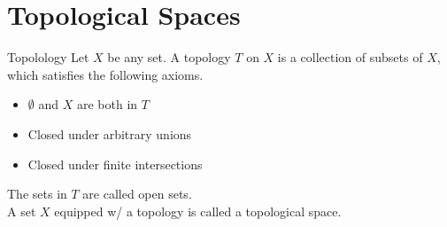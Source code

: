 \section{Topological Spaces}
\begin{definition}{Topolology}{}
    Let $X$ be any set. A topology $T$ on $X$ is a collection of subsets of
    $X$, which satisfies the following axioms.
    \begin{itemize}
        \item $\emptyset$ and $X$ are both in $T$
        \item Closed under arbitrary unions
        \item Closed under finite intersections
    \end{itemize}
\end{definition}
\noindent The sets in $T$ are called open sets.\\
A set $X$  equipped w/ a topology is called a topological space.


